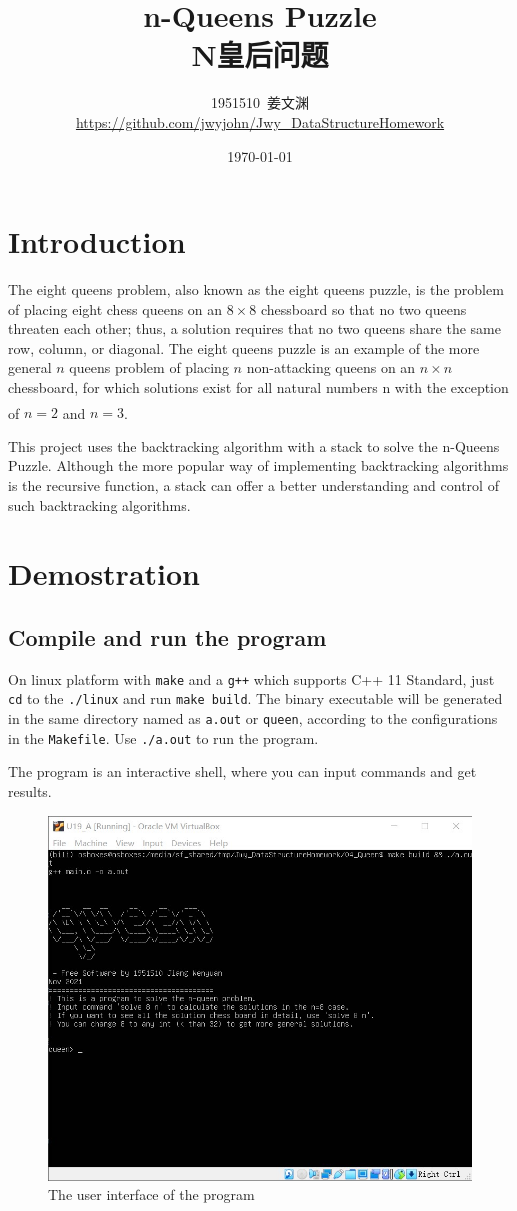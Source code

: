 \documentclass[cn,black,12pt,normal]{elegantnote}
\title{n-Queens Puzzle\\N皇后问题}
\author{1951510\ 姜文渊 \\ \small \url{https://github.com/jwyjohn/Jwy_DataStructureHomework}}
\institute{School of Software Engineering, Tongji University}
\date{\today}
\newcommand{\uct}[1]{\textsuperscript{\textsuperscript{\cite{#1}}}}
\begin{document}
\maketitle

\section{Introduction}

The eight queens problem, also known as the eight queens puzzle, is the problem of placing eight chess queens on an $8 \times 8$ chessboard so that no two queens threaten each other; thus, a solution requires that no two queens share the same row, column, or diagonal. The eight queens puzzle is an example of the more general $n$ queens problem of placing $n$ non-attacking queens on an $n \times n$ chessboard, for which solutions exist for all natural numbers n with the exception of $n = 2$ and $n = 3$.\uct{wiki:Eight_queens_puzzle}

This project uses the backtracking algorithm with a stack to solve the n-Queens Puzzle. Although the more popular way of implementing backtracking algorithms is the recursive function, a stack can offer a better understanding and control of such backtracking algorithms.

\section{Demostration}

\subsection{Compile and run the program}

On linux platform with \lstinline{make} and a \lstinline{g++} which supports C++ 11 Standard, just \lstinline{cd} to the \lstinline{./linux} and run \lstinline{make build}. The binary executable will be generated in the same directory named as \lstinline{a.out} or \lstinline{queen}, according to the configurations in the \lstinline{Makefile}. Use \lstinline{./a.out} to run the program.

The program is an interactive shell, where you can input commands and get results.

\begin{figure}[H]
    \centering
    \includegraphics[width=0.7\linewidth]{image/queen_01.jpg}
    \caption{The user interface of the program}
\end{figure}
\end{document}
